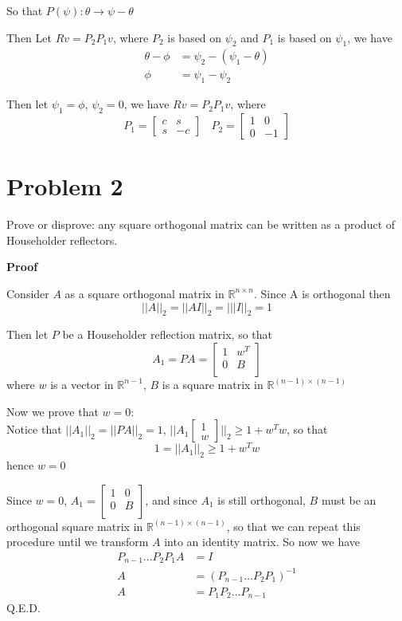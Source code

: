 \documentclass[12pt,oneside,a4paper]{article}
\newcommand{\problem}[1]
{
    \clearpage
    \section*{Problem {#1}}
}
\renewcommand{\proof}
{
    \vspace{15pt}
    \noindent\ignorespaces\textbf{\large Proof}\par
}
\begin{document}
So that $P(\psi): \theta \rightarrow \psi - \theta$

Then Let $Rv = P_{2}P_{1}v$, where $P_{2}$ is based on $\psi_{2}$ and $P_{1}$ is based on $\psi_{1}$, we have 
$$\begin{aligned}
\theta - \phi &= \psi_{2} - (\psi_{1} - \theta) \\ 
\phi &= \psi_{1} - \psi_{2}
\end{aligned}$$

Then let $\psi_{1} = \phi$, $\psi_{2} = 0$, we have $Rv = P_{2}P_{1}v$, where
$$P_{1} = \begin{bmatrix}
c & s\\
s & -c
\end{bmatrix}
~~~~P_{2} = \begin{bmatrix}
1 & 0\\
0 & -1
\end{bmatrix}$$

\problem{2}
Prove or disprove: any square orthogonal matrix can be written as a product of Householder reflectors.

\proof
Consider $A$ as a square orthogonal matrix in $\mathbb{R}^{n \times n}$. Since A is orthogonal then $$||A||_{2} = ||AI||_{2} = |||I||_{2} = 1$$

Then let $P$ be a Householder reflection matrix, so that
$$A_{1} = PA = \begin{bmatrix}
1 & w^{T}\\
0 & B\\
\end{bmatrix}$$
where $w$ is a vector in $\mathbb{R}^{n-1}$, $B$ is a square matrix in $\mathbb{R}^{(n-1) \times (n-1)}$

Now we prove that $w = 0$: \\
Notice that $||A_{1}||_{2} = ||PA||_{2} = 1$, $||A_{1}\begin{bmatrix}
1\\
w
\end{bmatrix}||_{2} \geq 1 + w^{T}w$, so that 
$$1 = ||A_{1}||_{2} \geq 1 + w^{T}w$$
hence $w = 0$

Since $w = 0$, $A_{1} = \begin{bmatrix}
1 & 0\\
0 & B\\
\end{bmatrix}$, and since $A_{1}$ is still orthogonal, $B$ must be an orthogonal square matrix in $\mathbb{R}^{(n-1)\times (n-1)}$, so that we can repeat this procedure until we transform $A$ into an identity matrix. So now we have
$$\begin{aligned}
P_{n-1} \dots P_{2}P_{1}A &= I \\
A &= (P_{n-1} \dots P_{2}P_{1})^{-1}\\
A &= P_{1}P_{2} \dots P_{n-1}
\end{aligned}$$
Q.E.D.
\end{document}
